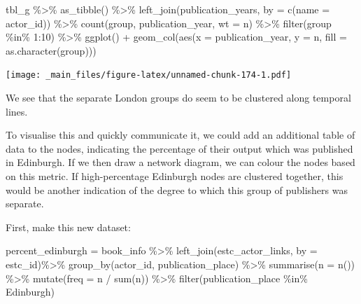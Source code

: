 \documentclass[
]{book}
\newenvironment{Shaded}{\begin{snugshade}}{\end{snugshade}}
\newcommand{\AttributeTok}[1]{\textcolor[rgb]{0.77,0.63,0.00}{#1}}
\newcommand{\DecValTok}[1]{\textcolor[rgb]{0.00,0.00,0.81}{#1}}
\newcommand{\FunctionTok}[1]{\textcolor[rgb]{0.00,0.00,0.00}{#1}}
\newcommand{\NormalTok}[1]{#1}
\newcommand{\OtherTok}[1]{\textcolor[rgb]{0.56,0.35,0.01}{#1}}
\newcommand{\SpecialCharTok}[1]{\textcolor[rgb]{0.00,0.00,0.00}{#1}}
\newcommand{\StringTok}[1]{\textcolor[rgb]{0.31,0.60,0.02}{#1}}
\begin{document}
\begin{Shaded}
\begin{Highlighting}[]
\NormalTok{ tbl\_g }\SpecialCharTok{\%\textgreater{}\%} 
  \FunctionTok{as\_tibble}\NormalTok{() }\SpecialCharTok{\%\textgreater{}\%} 
  \FunctionTok{left\_join}\NormalTok{(publication\_years, }\AttributeTok{by =} \FunctionTok{c}\NormalTok{(}\StringTok{\textquotesingle{}name\textquotesingle{}} \OtherTok{=} \StringTok{\textquotesingle{}actor\_id\textquotesingle{}}\NormalTok{)) }\SpecialCharTok{\%\textgreater{}\%} 
  \FunctionTok{count}\NormalTok{(group, publication\_year, }\AttributeTok{wt =}\NormalTok{ n) }\SpecialCharTok{\%\textgreater{}\%} 
   \FunctionTok{filter}\NormalTok{(group }\SpecialCharTok{\%in\%} \DecValTok{1}\SpecialCharTok{:}\DecValTok{10}\NormalTok{) }\SpecialCharTok{\%\textgreater{}\%} 
  \FunctionTok{ggplot}\NormalTok{() }\SpecialCharTok{+} \FunctionTok{geom\_col}\NormalTok{(}\FunctionTok{aes}\NormalTok{(}\AttributeTok{x =}\NormalTok{ publication\_year, }\AttributeTok{y =}\NormalTok{ n, }\AttributeTok{fill =} \FunctionTok{as.character}\NormalTok{(group)))}
\end{Highlighting}
\end{Shaded}

\texttt{[image: \_main\_files/figure-latex/unnamed-chunk-174-1.pdf]}

We see that the separate London groups do seem to be clustered along temporal lines.

To visualise this and quickly communicate it, we could add an additional table of data to the nodes, indicating the percentage of their output which was published in Edinburgh. If we then draw a network diagram, we can colour the nodes based on this metric. If high-percentage Edinburgh nodes are clustered together, this would be another indication of the degree to which this group of publishers was separate.

First, make this new dataset:

\begin{Shaded}
\begin{Highlighting}[]
\NormalTok{percent\_edinburgh }\OtherTok{=}\NormalTok{ book\_info }\SpecialCharTok{\%\textgreater{}\%} \FunctionTok{left\_join}\NormalTok{(estc\_actor\_links, }\AttributeTok{by =} \StringTok{\textquotesingle{}estc\_id\textquotesingle{}}\NormalTok{)}\SpecialCharTok{\%\textgreater{}\%}
  \FunctionTok{group\_by}\NormalTok{(actor\_id, publication\_place) }\SpecialCharTok{\%\textgreater{}\%}
  \FunctionTok{summarise}\NormalTok{(}\AttributeTok{n =} \FunctionTok{n}\NormalTok{()) }\SpecialCharTok{\%\textgreater{}\%}
  \FunctionTok{mutate}\NormalTok{(}\AttributeTok{freq =}\NormalTok{ n }\SpecialCharTok{/} \FunctionTok{sum}\NormalTok{(n)) }\SpecialCharTok{\%\textgreater{}\%} 
  \FunctionTok{filter}\NormalTok{(publication\_place }\SpecialCharTok{\%in\%}  \StringTok{\textquotesingle{}Edinburgh\textquotesingle{}}\NormalTok{)}
\end{Highlighting}
\end{Shaded}
\end{document}
